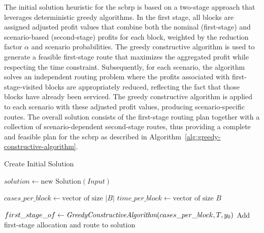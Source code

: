 The initial solution heuristic for the \gls{scbrp} is based on a two-stage approach that leverages deterministic greedy algorithms. In the first stage, all blocks are assigned adjusted profit values that combine both the nominal (first-stage) and scenario-based (second-stage) profits for each block, weighted by the reduction factor $\alpha$ and scenario probabilities. The greedy constructive algorithm is used to generate a feasible first-stage route that maximizes the aggregated profit while respecting the time constraint. Subsequently, for each scenario, the algorithm solves an independent routing problem where the profits associated with first-stage-visited blocks are appropriately reduced, reflecting the fact that those blocks have already been serviced. The greedy constructive algorithm is applied to each scenario with these adjusted profit values, producing scenario-specific routes. The overall solution consists of the first-stage routing plan together with a collection of scenario-dependent second-stage routes, thus providing a complete and feasible plan for the \gls{scbrp} as described in Algorithm~\ref{alg:greedy-constructive-algorithm}.

\begin{algorithm}[h!]
	\caption{Create Initial Solution}
	\SetAlgoLined

	$solution \leftarrow \text{new Solution}(Input)$\;

	$cases\_per\_block \leftarrow \text{vector of size } |B|$\;
	$time\_per\_block \leftarrow \text{vector of size } B$\;


	$first\_stage\_of \leftarrow \textit{GreedyConstructiveAlgorithm}(cases\_per\_block, T, y_0)$\;
	Add first-stage allocation and route to solution\;

	\;
\end{algorithm}

